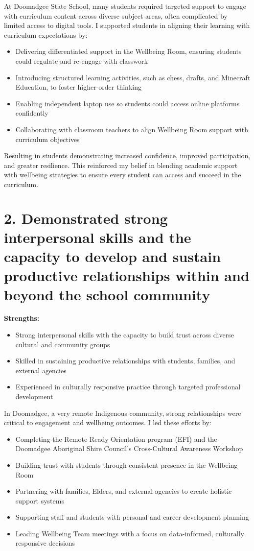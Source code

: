 \documentclass[11pt,a4paper]{article}
\begin{document}
At Doomadgee State School, many students required targeted support to engage with curriculum content across diverse subject areas, often complicated by limited access to digital tools. I supported students in aligning their learning with curriculum expectations by:
\begin{itemize}
    \item Delivering differentiated support in the Wellbeing Room, ensuring students could regulate and re-engage with classwork
    \item Introducing structured learning activities, such as chess, drafts, and Minecraft Education, to foster higher-order thinking
    \item Enabling independent laptop use so students could access online platforms confidently
    \item Collaborating with classroom teachers to align Wellbeing Room support with curriculum objectives
\end{itemize}

Resulting in students demonstrating increased confidence, improved participation, and greater resilience. This reinforced my belief in blending academic support with wellbeing strategies to ensure every student can access and succeed in the curriculum.

\section*{2. Demonstrated strong interpersonal skills and the capacity to develop and sustain productive relationships within and beyond the school community}

\textbf{Strengths:}
\begin{itemize}
    \item Strong interpersonal skills with the capacity to build trust across diverse cultural and community groups
    \item Skilled in sustaining productive relationships with students, families, and external agencies
    \item Experienced in culturally responsive practice through targeted professional development
\end{itemize}

In Doomadgee, a very remote Indigenous community, strong relationships were critical to engagement and wellbeing outcomes. I led these efforts by:
\begin{itemize}
    \item Completing the Remote Ready Orientation program (EFI) and the Doomadgee Aboriginal Shire Council's Cross-Cultural Awareness Workshop
    \item Building trust with students through consistent presence in the Wellbeing Room
    \item Partnering with families, Elders, and external agencies to create holistic support systems
    \item Supporting staff and students with personal and career development planning
    \item Leading Wellbeing Team meetings with a focus on data-informed, culturally responsive decisions
\end{itemize}
\end{document}

